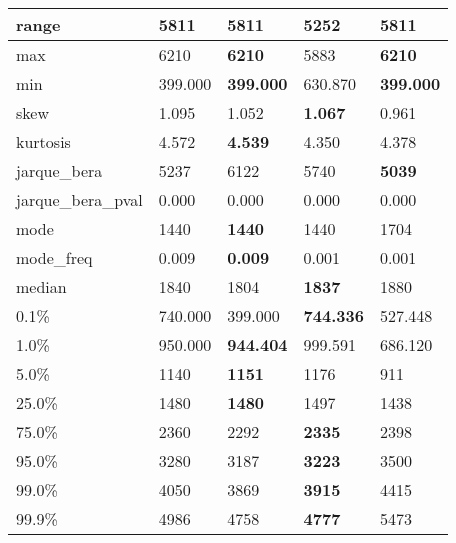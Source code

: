 \begin{table}[H]
\begin{tabular}{|l|m{10em}|m{10em}|m{10em}|m{10em}|}
\hline range & 5811 & \bfseries 5811 & \cellcolor[rgb]{0.9, 0.54, 0.52} 5252 & \bfseries 5811 \\
\hline max & 6210 & \bfseries 6210 & \cellcolor[rgb]{0.9, 0.54, 0.52} 5883 & \bfseries 6210 \\
\hline min & 399.000 & \bfseries 399.000 & \cellcolor[rgb]{0.9, 0.54, 0.52} 630.870 & \bfseries 399.000 \\
\hline skew & 1.095 & 1.052 & \bfseries 1.067 & \cellcolor[rgb]{0.9, 0.54, 0.52} 0.961 \\
\hline kurtosis & 4.572 & \bfseries 4.539 & \cellcolor[rgb]{0.9, 0.54, 0.52} 4.350 & 4.378 \\
\hline jarque\_bera & 5237 & \cellcolor[rgb]{0.9, 0.54, 0.52} 6122 & 5740 & \bfseries 5039 \\
\hline jarque\_bera\_pval & 0.000 & 0.000 & 0.000 & 0.000 \\
\hline mode & 1440 & \bfseries 1440 & 1440 & \cellcolor[rgb]{0.9, 0.54, 0.52} 1704 \\
\hline mode\_freq & 0.009 & \bfseries 0.009 & \cellcolor[rgb]{0.9, 0.54, 0.52} 0.001 & 0.001 \\
\hline median & 1840 & 1804 & \bfseries 1837 & \cellcolor[rgb]{0.9, 0.54, 0.52} 1880 \\
\hline 0.1\% & 740.000 & \cellcolor[rgb]{0.9, 0.54, 0.52} 399.000 & \bfseries 744.336 & 527.448 \\
\hline 1.0\% & 950.000 & \bfseries 944.404 & 999.591 & \cellcolor[rgb]{0.9, 0.54, 0.52} 686.120 \\
\hline 5.0\% & 1140 & \bfseries 1151 & 1176 & \cellcolor[rgb]{0.9, 0.54, 0.52} 911 \\
\hline 25.0\% & 1480 & \bfseries 1480 & 1497 & \cellcolor[rgb]{0.9, 0.54, 0.52} 1438 \\
\hline 75.0\% & 2360 & \cellcolor[rgb]{0.9, 0.54, 0.52} 2292 & \bfseries 2335 & 2398 \\
\hline 95.0\% & 3280 & 3187 & \bfseries 3223 & \cellcolor[rgb]{0.9, 0.54, 0.52} 3500 \\
\hline 99.0\% & 4050 & 3869 & \bfseries 3915 & \cellcolor[rgb]{0.9, 0.54, 0.52} 4415 \\
\hline 99.9\% & 4986 & 4758 & \bfseries 4777 & \cellcolor[rgb]{0.9, 0.54, 0.52} 5473 \\
\hline
\end{tabular}
\end{table}
